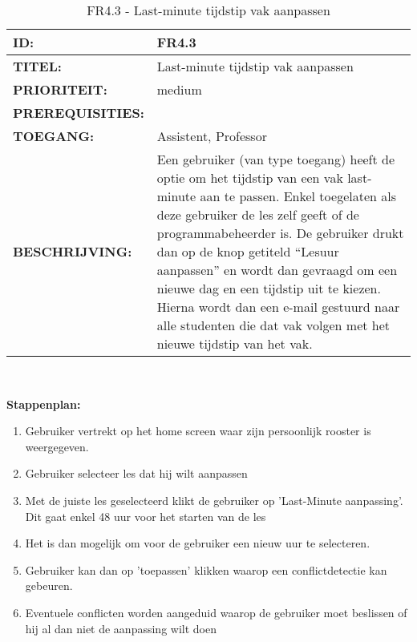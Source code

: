 \noindent\begin{table}[H]
            \begin{tabular}{l | p{10cm}}
                \textbf{ID:} & FR4.3 \\ \hline
                \textbf{TITEL:} & Last-minute tijdstip vak aanpassen\\ \hline
                \textbf{PRIORITEIT:} &  medium \\ \hline
                \textbf{PREREQUISITIES:} & \\ \hline
                \textbf{TOEGANG:} & Assistent, Professor \\ \hline
                \textbf{BESCHRIJVING:} & Een gebruiker (van type toegang) heeft de optie om het tijdstip van een vak last-minute aan te passen. Enkel toegelaten als deze gebruiker de les zelf geeft of de programmabeheerder is.  De gebruiker drukt dan op de knop getiteld “Lesuur aanpassen” en wordt dan gevraagd om een nieuwe dag en een tijdstip uit te kiezen. 
                                        Hierna wordt dan een e-mail gestuurd naar alle studenten die dat vak volgen met het nieuwe tijdstip van het vak.\\ 
            \end{tabular}\\
            \caption{FR4.3 - Last-minute tijdstip vak aanpassen}
            \label{tab:FR4.3 - Last-minute tijdstip vak aanpassen}
        \end{table}
       
\textbf{Stappenplan:}
	\begin{enumerate}
	\item Gebruiker vertrekt op het home screen waar zijn persoonlijk rooster is weergegeven.
	\item Gebruiker selecteer les dat hij wilt aanpassen
	\item Met de juiste les geselecteerd klikt de gebruiker op 'Last-Minute aanpassing'. Dit gaat enkel 48 uur voor het starten van de les
	\item Het is dan mogelijk om voor de gebruiker een nieuw uur te selecteren.
	\item Gebruiker kan dan op 'toepassen' klikken waarop een conflictdetectie kan gebeuren.
	\item Eventuele conflicten worden aangeduid waarop de gebruiker moet beslissen of hij al dan niet de aanpassing wilt doen
	\end{enumerate}
        
